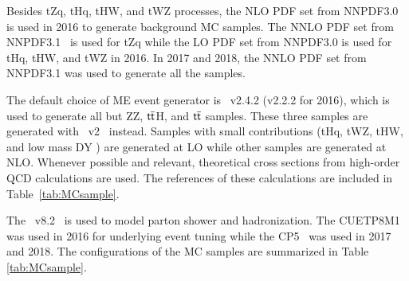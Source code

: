 Besides tZq, tHq, tHW, and tWZ processes, the \ac{NLO} \ac{PDF} set from NNPDF3.0~\cite{NNPDF:2014otw} is used in 2016 to generate background \ac{MC} samples. The \ac{NNLO} \ac{PDF} set from NNPDF3.1~\cite{NNPDF:2017mvq} is used for tZq while the \ac{LO} \ac{PDF} set from NNPDF3.0 is used for tHq, tHW, and tWZ in 2016. In 2017 and 2018, the \ac{NNLO} \ac{PDF} set from NNPDF3.1 was used to generate all the samples. 

The default choice of \ac{ME} event generator is \MG~v2.4.2 (v2.2.2 for 2016), which is used to generate all but ZZ, $\textsf{t}\overline{\textsf{t}}$H, and $\textsf{t}\overline{\textsf{t}}$ samples. These three samples are generated with \Pow~v2~\cite{Frixione:2007vw} instead. Samples with small contributions (tHq, tWZ, tHW, and low mass \ac{DY} ) are generated at \ac{LO} while other samples are generated at \ac{NLO}. Whenever possible and relevant, theoretical cross sections from high-order \ac{QCD} calculations are used. The references of these calculations are included in Table~\ref{tab:MCsample}.

The \PY~v8.2~\cite{Sjostrand:2014zea} is used to model parton shower and hadronization. The CUETP8M1~\cite{CMS:2015wcf} was used in 2016 for underlying event tuning while the CP5~\cite{CMS:2019csb} was used in 2017 and 2018. The configurations of the \ac{MC} samples are summarized in Table \ref{tab:MCsample}. 

